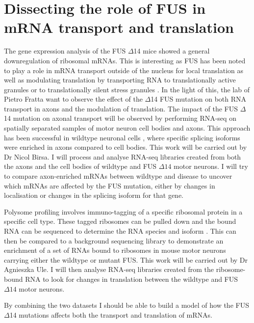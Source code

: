 \section{Dissecting the role of FUS in mRNA transport and translation}
The gene expression analysis of the FUS $\Delta$14 mice showed a general downregulation of ribosomal mRNAs. This is interesting as FUS has been noted to play a role in mRNA transport outside of the nucleus for local translation \citep{Kanai2004,Fujii2005} as well as modulating translation by transporting RNA to translationally active granules \citep{Yasuda2013} or to translationally silent stress granules \citep{Bosco2010}. In the light of this, the lab of Pietro Fratta want to observe the effect of the $\Delta$14 FUS mutation on both RNA transport in axons and the modulation of translation. 
The impact of the FUS $\Delta$14 mutation on axonal transport will be observed by performing RNA-seq on spatially separated samples of motor neuron cell bodies and axons. This approach has been successful in wildtype neuronal cells \citep{Taliaferro2016}, where specific splicing isoforms were enriched in axons compared to cell bodies. This work will be carried out by Dr Nicol Birsa. I will process and analyse RNA-seq libraries created from both the axons and the cell bodies of wildtype and FUS $\Delta14$ motor neurons. I will try to compare axon-enriched mRNAs between wildtype and disease to uncover which mRNAs are affected by the FUS mutation, either by changes in localisation or changes in the splicing isoform for that gene.

Polysome profiling involves immuno-tagging of a specific ribosomal protein in a specific cell type. These tagged ribosomes can be pulled down and the bound RNA can be sequenced to determine the RNA species and isoform \citep{Shigeoka2016}. This can then be compared to a background sequencing library to demonstrate an enrichment of a set of RNAs bound to ribosomes in mouse motor neurons carrying either the wildtype or mutant FUS. This work will be carried out by Dr Agnieszka Ule. I will then analyse RNA-seq libraries created from the ribosome-bound RNA to look for changes in translation between the wildtype and FUS $\Delta14$ motor neurons.

By combining the two datasets I should be able to build a model of how the FUS $\Delta$14 mutations affects both the transport and translation of mRNAs. 

